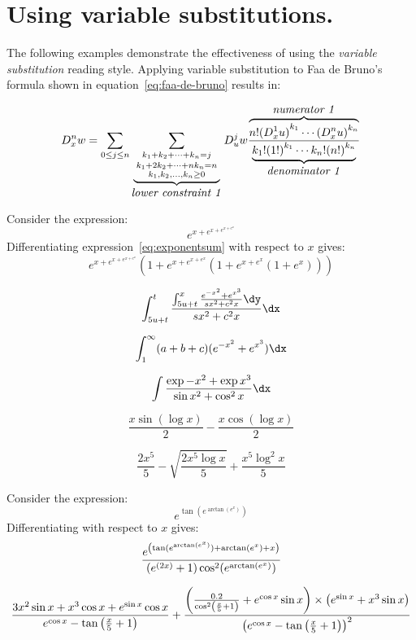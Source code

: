 
\section{Using variable substitutions.}
\activatevariablesubstitution

The following examples demonstrate the effectiveness of using the
{\em variable substitution\/}  reading style.
Applying variable substitution to Faa de Bruno's formula shown in
equation~\ref{eq:faa-de-bruno} results in:

\begin{equation}  \label{eq:faa-de-bruno-subst}
  D^n_xw = \sum_{0\le j\le n} \sum_{\underbrace{{\scriptstyle
        k_1+k_2+\cdots+k_n=j \atop {\scriptstyle
          k_1+2k_2+\cdots+nk_n=n \atop {\scriptstyle
            k_1,k_2,\ldots,k_n\ge0 }}}}_{\mbox{\em lower constraint
        1\/}}} D^j_u w
  \frac{\overbrace{n!  {(D^1_x u)}^{k_1} \cdots
      {(D^n_x u)}^{k_n}} ^{\mbox{\em numerator 1\/}}}
  {\underbrace{k_1!{(1!)}^{k_1}
    \cdots k_n!{(n!)}^{k_n}}_{\mbox{\em denominator 1\/}}}
\end{equation}

Consider the expression:
\begin{equation}
  e^{x+e^{x+e^{x+e^x}}} \label{eq:exponentsum}
\end{equation}
Differentiating  expression~\ref{eq:exponentsum} with respect to $x$
gives:
$$   e^{x + e^{x + e^{x + e^x}}}
      (1 + e^{x + e^{x + e^x}}
      (1 + e^{x + e^x} (1 + e^x)))$$

        $$\int_{5u+t}^t
        \frac{ \int_{5u+t}^x
          \frac{e^{-x^2} + e^{x^3} }
          {sx^2 + c^{2 }x } \dy}
{s  x^2 + c^2  x}  \dx$$


        $$ \int_1^\infty (a+b+c)(e^{-x^2} + e^{x^3})\dx$$

        $$ \int \frac{\exp{-x^2} + \exp {x^3} }{\sin x^2 + \cos^2 x}
        \dx$$



$$  \frac{x\sin(\log x)}{2} - \frac{x\cos(\log x)}{2}$$

$$ \frac{2x^5}{5} - \sqrt{\frac{2x^5 \log x}{5}}
+ \frac{x^5\log^2 x}{5}$$

Consider the expression:
\[ e^{\tan(e^{\arctan(e^x)})}\]
Differentiating with respect to $x$ gives:
\[
  {e^{\left( \tan(e^{\arctan(e^x)}) + \arctan(e^x) + x \right)}
       \over (e^{(2 x)} + 1) \cos^2(e^{\arctan(e^x)})}
     \]


\[  {3 x^2 \sin{x} + x^3 \cos{x} + e^{\sin{x}} \cos{x}
       \over e^{\cos{x}} - \tan\left( {x \over 5} + 1 \right)}
      + {\left( {0.2 \over \cos^2 \left( {x \over 5} + 1 \right)}
      + e^{\cos{x}} \sin{x} \right)
           \times \left( e^{\sin{x}} + x^3 \sin{x} \right)
           \over \left( e^{\cos{x}}
      - \tan\left( {x \over 5} + 1 \right) \right)^2}
    \]


    \deactivatevariablesubstitution





